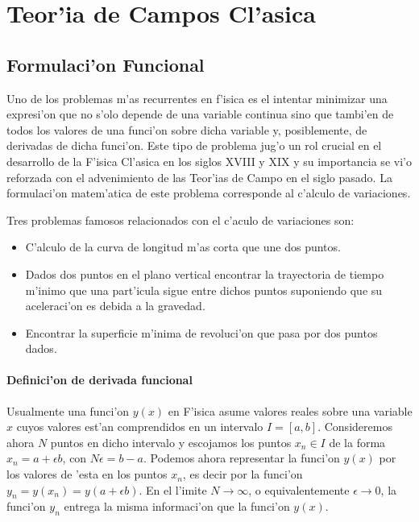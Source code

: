 \appendix
\chapter{Teor'ia de Campos Cl'asica}
\section{Formulaci'on Funcional}

Uno de los problemas m'as recurrentes en f'isica es el intentar minimizar una
expresi'on que no s'olo depende de una variable continua sino que tambi'en de todos
los valores de una funci'on sobre dicha variable y, posiblemente, de derivadas de
dicha funci'on. Este tipo de problema jug'o un rol crucial en el desarrollo de la
F'isica Cl'asica en los siglos XVIII y XIX y su importancia se vi'o reforzada con
el advenimiento de las Teor'ias de Campo en el siglo pasado. La formulaci'on
matem'atica de este problema corresponde al c'alculo de variaciones.

Tres problemas famosos relacionados con el c'aculo de variaciones son:

\begin{itemize}
\item C'alculo de la curva de longitud m'as corta que une dos puntos.
\item Dados dos puntos en el plano vertical encontrar la trayectoria de tiempo
m'inimo que una part'icula sigue entre dichos puntos suponiendo que 
su aceleraci'on es debida a la gravedad. 
\item Encontrar la  superficie m'inima de revoluci'on que pasa por dos puntos
dados.
\end{itemize}

\subsubsection{Definici'on de derivada funcional}

Usualmente una funci'on $y(x)$ en F'isica asume valores reales sobre una variable
$x$ cuyos valores est'an comprendidos en un intervalo $I=\left[ a,b\right] $.
Consideremos ahora $N$ puntos en dicho intervalo y escojamos los puntos $x_n\in
I$ de la forma $x_n=a+\epsilon b$, con $N\epsilon=b-a$. Podemos ahora
representar la funci'on $y(x)$ por los valores de 'esta en los puntos $x_n$, es
decir por la funci'on $y_n=y(x_n)=y(a+\epsilon b)$. En el l'imite
$N\rightarrow\infty$, o equivalentemente $\epsilon\rightarrow 0 $, la funci'on
$y_n$ entrega la misma informaci'on que la funci'on $y(x)$.

